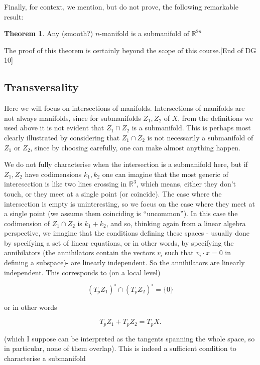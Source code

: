 \documentclass{article}
\theoremstyle{definition}
\newtheorem{theorem}{Theorem}
\begin{document}
Finally, for context, we mention, but do not prove, the following remarkable
result:

\begin{theorem}
  Any (smooth?) $n$-manifold is a submanifold of $\mathbb{R}^{2n}$
\end{theorem}

The proof of this theorem is certainly beyond the scope of this course.[End of
DG 10]

\subsection{Transversality}

Here we will focus on intersections of manifolds. Intersections of manifolds are
not always manifolds, since for submanifolds $Z_1, Z_2$ of $X$, from the
definitions we used above it is not evident that $Z_1 \cap Z_2$ is a
submanifold. This is perhaps most clearly illustrated by considering that $Z_1
\cap Z_2$ is not necessarily a submanifold of $Z_1$ or $Z_2$, since by choosing
carefully, one can make almost anything happen.

We do not fully characterise when the intersection is a submanifold here, but
if $Z_1, Z_2$ have codimensions $k_1, k_2$ one can imagine that the most generic
of interesection is like two lines crossing in $\mathbb{R}^3$, which means,
either they don't touch, or they meet at a single point (or coincide). The case
where the intersection is empty is uninteresting, so we focus on the case where
they meet at a single point (we assume them coinciding is ``uncommon''). In this
case the codimension of $Z_1 \cap Z_2$ is $k_1 + k_2$, and so, thinking again
from a linear algebra perspective, we imagine that the conditions defining these
spaces - usually done by specifying a set of linear equations, or in other
words, by specifying the annihilators (the annihilators contain the vectors
$v_i$ such that $v_i \cdot x = 0$ in defining a subspace)- are linearly
independent. So the annihilators are linearly independent. This corresponds to
(on a local level)

$$ (T_p Z_1)^\circ \cap (T_pZ_2)^\circ = \{0\} $$

or in other words

$$ T_p Z_1 + T_p Z_2 = T_p X. $$

(which I suppose can be interpreted as the tangents spanning the whole space, so
in particular, none of them overlap). This is indeed a sufficient condition to
characterise a submanifold
\end{document}
